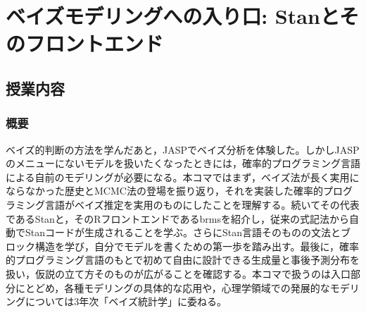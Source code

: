 \section{ベイズモデリングへの入り口: Stanとそのフロントエンド}
\label{b29_bayesianModeling}

\subsection{授業内容}

\subsubsection{概要}
ベイズ的判断の方法を学んだあと，JASPでベイズ分析を体験した。しかしJASPのメニューにないモデルを扱いたくなったときには，確率的プログラミング言語による自前のモデリングが必要になる。本コマではまず，ベイズ法が長く実用にならなかった歴史とMCMC法の登場を振り返り，それを実装した確率的プログラミング言語がベイズ推定を実用のものにしたことを理解する。続いてその代表であるStanと，そのRフロントエンドであるbrmsを紹介し，従来の式記法から自動でStanコードが生成されることを学ぶ。さらにStan言語そのものの文法とブロック構造を学び，自分でモデルを書くための第一歩を踏み出す。最後に，確率的プログラミング言語のもとで初めて自由に設計できる生成量と事後予測分布を扱い，仮説の立て方そのものが広がることを確認する。本コマで扱うのは入口部分にとどめ，各種モデリングの具体的な応用や，心理学領域での発展的なモデリングについては3年次「ベイズ統計学」に委ねる。

